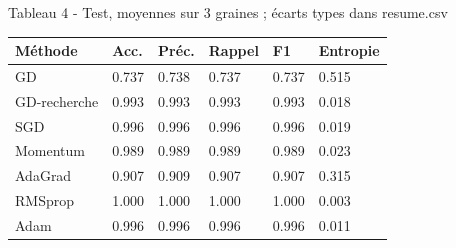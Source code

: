 \documentclass[10pt,a4paper]{article}
\begin{document}
\begin{center}{\footnotesize Tableau 4 - Test, moyennes sur 3 graines ; écarts types dans resume.csv\par\medskip\begin{tabular}{llllll}\toprule
Méthode & Acc. & Préc. & Rappel & F1 & Entropie \\
\midrule
GD & 0.737 & 0.738 & 0.737 & 0.737 & 0.515 \\
GD-recherche & 0.993 & 0.993 & 0.993 & 0.993 & 0.018 \\
SGD & 0.996 & 0.996 & 0.996 & 0.996 & 0.019 \\
Momentum & 0.989 & 0.989 & 0.989 & 0.989 & 0.023 \\
AdaGrad & 0.907 & 0.909 & 0.907 & 0.907 & 0.315 \\
RMSprop & 1.000 & 1.000 & 1.000 & 1.000 & 0.003 \\
Adam & 0.996 & 0.996 & 0.996 & 0.996 & 0.011 \\
\bottomrule\end{tabular}}\end{center}
\end{document}
